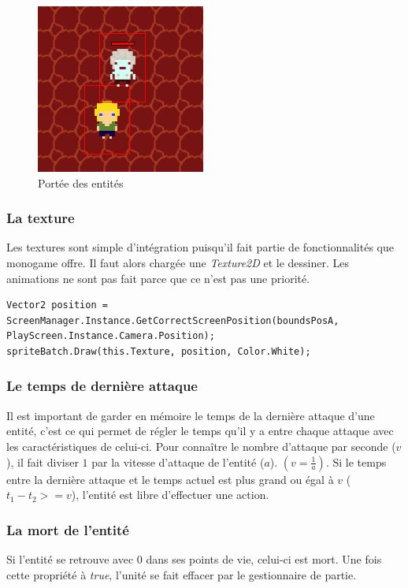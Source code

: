 \documentclass[11pt, a4paper, oneside]{report}
\begin{document}
\begin{figure}[h]
	\begin{center}
	\includegraphics[width=.5\textwidth]{hitbox}
	\caption{Portée des entités}
	\label{fig:hitbox}
	\end{center}
\end{figure}

\subsubsection{La texture}
Les textures sont simple d'intégration puisqu'il fait partie de fonctionnalités que monogame offre. Il faut alors chargée une \textit{Texture2D} et le dessiner. Les animations ne sont pas fait parce que ce n'est pas une priorité.
\begin{lstlisting}[caption=Affichage de la texture sur l'écran, label=lst:afftextuecran]
Vector2 position = ScreenManager.Instance.GetCorrectScreenPosition(boundsPosA, PlayScreen.Instance.Camera.Position);
spriteBatch.Draw(this.Texture, position, Color.White);
\end{lstlisting}

\subsubsection{Le temps de dernière attaque}
Il est important de garder en mémoire le temps de la dernière attaque d'une entité, c'est ce qui permet de régler le temps qu'il y a entre chaque attaque avec les caractéristiques de celui-ci. Pour connaître le nombre d'attaque par seconde ($v$), il fait diviser $1$ par la vitesse d'attaque de l'entité ($a$). $(v = \frac{1}{a})$. Si le temps entre la dernière attaque et le temps actuel est plus grand ou égal à $v$ ($t_1 - t_2 >= v$), l'entité est libre d'effectuer une action.

\subsubsection{La mort de l'entité}
Si l'entité se retrouve avec 0 dans ses points de vie, celui-ci est mort. Une fois cette propriété à \textit{true}, l'unité se fait effacer par le gestionnaire de partie.
\end{document}
